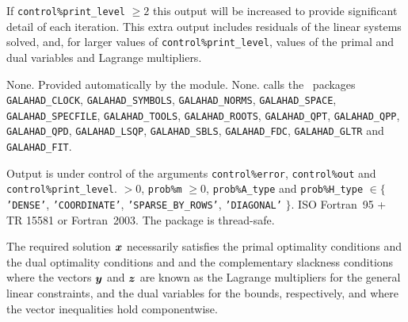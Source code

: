 \documentclass{galahad}
\newcommand{\packagename}{QPB}
\begin{document}
If {\tt control\%print\_level} $\geq 2$ this 
output will be increased to provide significant detail of each iteration. 
This extra output includes residuals of the linear systems solved, and,
for larger values of {\tt control\%print\_level}, values of the primal and dual
variables and Lagrange multipliers. 


\galgeneral

\galcommon None.
\galworkspace Provided automatically by the module.
\galroutines None. 
\galmodules {\tt \packagename\_solve} calls the \galahad\ packages
\sloppy
{\tt GALAHAD\_\-CLOCK},
{\tt GALAHAD\_SY\-M\-BOLS}, 
{\tt GALAHAD\_NORMS}, 
{\tt GALAHAD\_SPACE}, 
{\tt GALAHAD\_SPECFILE},
{\tt GALAHAD\_TOOLS}, 
{\tt GALAHAD\_ROOTS}, 
{\tt GALAHAD\_QPT},
{\tt GA\-LAHAD\_QPP}, 
{\tt GALAHAD\_QPD},
{\tt GALAHAD\_LSQP}, 
{\tt GALAHAD\_SBLS},
{\tt GALAHAD\_FDC}, 
{\tt GALAHAD\_GLTR}
and
{\tt GALAHAD\_FIT}.

\galio Output is under control of the arguments
 {\tt control\%error}, {\tt control\%out} and {\tt control\%print\_level}.
 $> 0$, {\tt prob\%m} $\geq  0$, 
{\tt prob\%A\_type} and {\tt prob\%H\_type} $\in \{${\tt 'DENSE'}, 
 {\tt 'COORDINATE'}, {\tt 'SPARSE\_BY\_ROWS'}, {\tt 'DIAGONAL'} $\}$. 
\galportability ISO Fortran~95 + TR 15581 or Fortran~2003. 
The package is thread-safe.


\galmethod
The required solution ${\bm{x}}$ necessarily satisfies 
the primal optimality conditions
and 
the dual optimality conditions
and 
and the complementary slackness conditions 
where the vectors ${\bm{y}}$ and ${\bm{z}}$ are 
known as the Lagrange multipliers for
the general linear constraints, and the dual variables for the bounds,
respectively, and where the vector inequalities hold componentwise.
\end{document}
